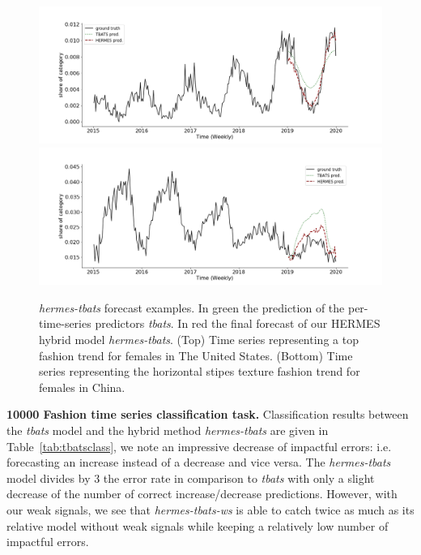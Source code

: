 \documentclass[review]{elsarticle}
\begin{document}
\begin{figure}
\centering
  \includegraphics[width=1.\linewidth]{us_female_top}
  \includegraphics[width=1.\linewidth]{cn_female_texture_horizontalstripe}
\caption{\textit{hermes-tbats} forecast examples. In green the prediction of the per-time-series predictors \textit{tbats}. In red the final forecast of our HERMES hybrid model \textit{hermes-tbats}. (Top) Time series representing a top fashion trend for females in The United States. (Bottom) Time series representing the horizontal stipes texture fashion trend for females in China.}
\label{fig:examples}
\end{figure}

\textbf{10000 Fashion time series classification task. } Classification results between the \textit{tbats} model and the hybrid method \textit{hermes-tbats} are given in Table~\ref{tab:tbatsclass}, we note an impressive decrease of impactful errors: i.e. forecasting an increase instead of a decrease and vice versa. The \textit{hermes-tbats} model divides by 3 the error rate in comparison to \textit{tbats} with only a slight decrease of the number of correct increase/decrease predictions. However, with our weak signals, we see that \textit{hermes-tbats-ws} is able to catch twice as much as its relative model without weak signals while keeping a relatively low number of impactful errors.
\end{document}
